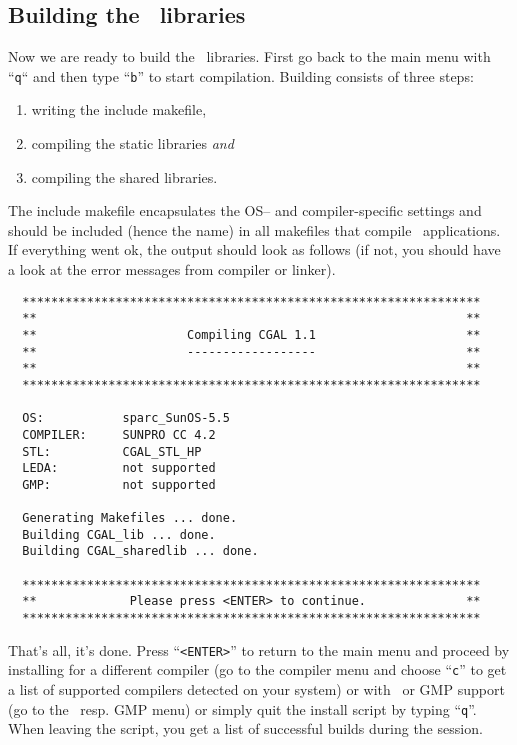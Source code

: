 \subsection{Building the \cgal\ libraries \label{sec:build-the-libs}}

Now we are ready to build the \cgal\ libraries.  First go back to the
main menu with ``\texttt{q}`` and then type ``{\tt b}'' to start
compilation. Building consists of three steps:
\begin{enumerate}
\item writing the include makefile,
\item compiling the static libraries \textit{and}
\item compiling the shared libraries.
\end{enumerate}
The include makefile encapsulates the OS-- and compiler-specific
settings and should be included (hence the name) in all makefiles that
compile \cgal\ applications. If everything went ok, the output should
look as follows (if not, you should have a look at the error messages
from compiler or linker).

\begin{scriptsize}
\begin{verbatim}
  ****************************************************************
  **                                                            **
  **                     Compiling CGAL 1.1                     **
  **                     ------------------                     **
  **                                                            **
  ****************************************************************

  OS:           sparc_SunOS-5.5
  COMPILER:     SUNPRO CC 4.2
  STL:          CGAL_STL_HP
  LEDA:         not supported
  GMP:          not supported

  Generating Makefiles ... done.
  Building CGAL_lib ... done.
  Building CGAL_sharedlib ... done.

  ****************************************************************
  **             Please press <ENTER> to continue.              **
  ****************************************************************
\end{verbatim}
\end{scriptsize}

That's all, it's done. Press ``\texttt{<ENTER>}'' to return to the main
menu and proceed by installing for a different compiler (go to the
compiler menu and choose ``\texttt{c}'' to get a list of supported
compilers detected on your system) or with \leda\ or GMP support (go
to the \leda\ resp.  GMP menu) or simply quit the install script by
typing ``\texttt{q}''. When leaving the script, you get a list of
successful builds during the session.

